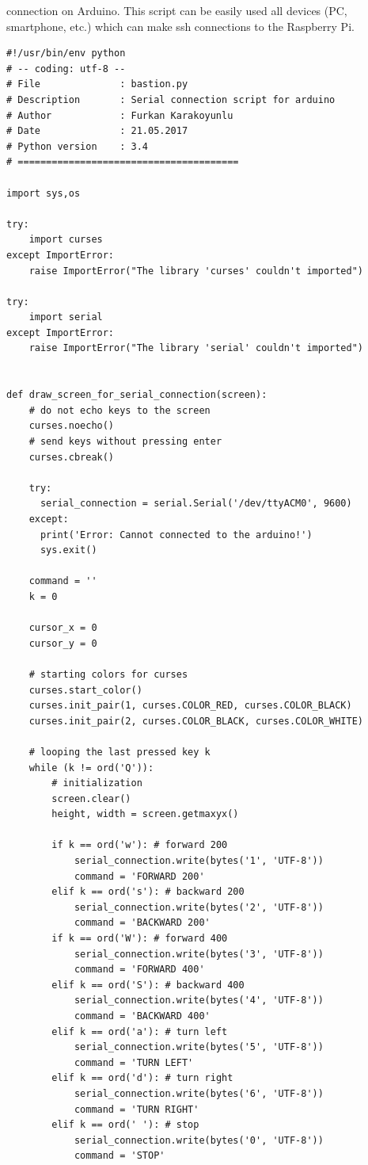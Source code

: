 \documentclass[12pt,a4paper]{article}
\begin{document}
connection on Arduino. This script can be easily used all devices (PC, smartphone, etc.) which can make ssh connections to the
Raspberry Pi.
\begin{verbatim}
#!/usr/bin/env python
# -- coding: utf-8 --
# File              : bastion.py
# Description       : Serial connection script for arduino
# Author            : Furkan Karakoyunlu
# Date              : 21.05.2017
# Python version    : 3.4
# =======================================

import sys,os

try:
    import curses
except ImportError:
    raise ImportError("The library 'curses' couldn't imported")

try:
    import serial
except ImportError:
    raise ImportError("The library 'serial' couldn't imported")


def draw_screen_for_serial_connection(screen):
    # do not echo keys to the screen
    curses.noecho()
    # send keys without pressing enter
    curses.cbreak()

    try:
      serial_connection = serial.Serial('/dev/ttyACM0', 9600)
    except:
      print('Error: Cannot connected to the arduino!')
      sys.exit()

    command = ''
    k = 0

    cursor_x = 0
    cursor_y = 0

    # starting colors for curses
    curses.start_color()
    curses.init_pair(1, curses.COLOR_RED, curses.COLOR_BLACK)
    curses.init_pair(2, curses.COLOR_BLACK, curses.COLOR_WHITE)

    # looping the last pressed key k
    while (k != ord('Q')):
        # initialization
        screen.clear()
        height, width = screen.getmaxyx()

        if k == ord('w'): # forward 200
            serial_connection.write(bytes('1', 'UTF-8'))
            command = 'FORWARD 200'
        elif k == ord('s'): # backward 200
            serial_connection.write(bytes('2', 'UTF-8'))
            command = 'BACKWARD 200'
        if k == ord('W'): # forward 400
            serial_connection.write(bytes('3', 'UTF-8'))
            command = 'FORWARD 400'
        elif k == ord('S'): # backward 400
            serial_connection.write(bytes('4', 'UTF-8'))
            command = 'BACKWARD 400'
        elif k == ord('a'): # turn left
            serial_connection.write(bytes('5', 'UTF-8'))
            command = 'TURN LEFT'
        elif k == ord('d'): # turn right
            serial_connection.write(bytes('6', 'UTF-8'))
            command = 'TURN RIGHT'
        elif k == ord(' '): # stop
            serial_connection.write(bytes('0', 'UTF-8'))
            command = 'STOP'


\end{verbatim}
\end{document}
